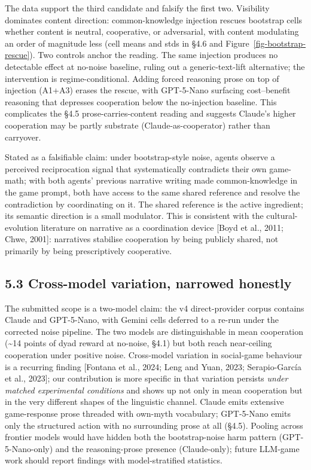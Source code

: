 \documentclass[
  10pt,
  letterpaper,
]{article}
\begin{document}
The data support the third candidate and falsify the first two.
Visibility dominates content direction: common-knowledge injection
rescues bootstrap cells whether content is neutral, cooperative, or
adversarial, with content modulating an order of magnitude less (cell
means and stds in §4.6 and Figure~\ref{fig-bootstrap-rescue}). Two
controls anchor the reading. The same injection produces no detectable
effect at no-noise baseline, ruling out a generic-text-lift alternative;
the intervention is regime-conditional. Adding forced reasoning prose on
top of injection (A1+A3) erases the rescue, with GPT-5-Nano surfacing
cost--benefit reasoning that depresses cooperation below the
no-injection baseline. This complicates the §4.5 prose-carries-content
reading and suggests Claude's higher cooperation may be partly substrate
(Claude-as-cooperator) rather than carryover.

Stated as a falsifiable claim: under bootstrap-style noise, agents
observe a perceived reciprocation signal that systematically contradicts
their own game-math; with both agents' previous narrative writing made
common-knowledge in the game prompt, both have access to the same shared
reference and resolve the contradiction by coordinating on it. The
shared reference is the active ingredient; its semantic direction is a
small modulator. This is consistent with the cultural-evolution
literature on narrative as a coordination device {[}Boyd et al., 2011;
Chwe, 2001{]}: narratives stabilise cooperation by being publicly
shared, not primarily by being prescriptively cooperative.

\subsection{5.3 Cross-model variation, narrowed
honestly}\label{cross-model-variation-narrowed-honestly}

The submitted scope is a two-model claim: the v4 direct-provider corpus
contains Claude and GPT-5-Nano, with Gemini cells deferred to a re-run
under the corrected noise pipeline. The two models are distinguishable
in mean cooperation (\textasciitilde14 points of dyad reward at
no-noise, §4.1) but both reach near-ceiling cooperation under positive
noise. Cross-model variation in social-game behaviour is a recurring
finding {[}Fontana et al., 2024; Leng and Yuan, 2023; Serapio-García et
al., 2023{]}; our contribution is more specific in that variation
persists \emph{under matched experimental conditions} and shows up not
only in mean cooperation but in the very different shapes of the
linguistic channel. Claude emits extensive game-response prose threaded
with own-myth vocabulary; GPT-5-Nano emits only the structured action
with no surrounding prose at all (§4.5). Pooling across frontier models
would have hidden both the bootstrap-noise harm pattern
(GPT-5-Nano-only) and the reasoning-prose presence (Claude-only); future
LLM-game work should report findings with model-stratified statistics.
\end{document}
